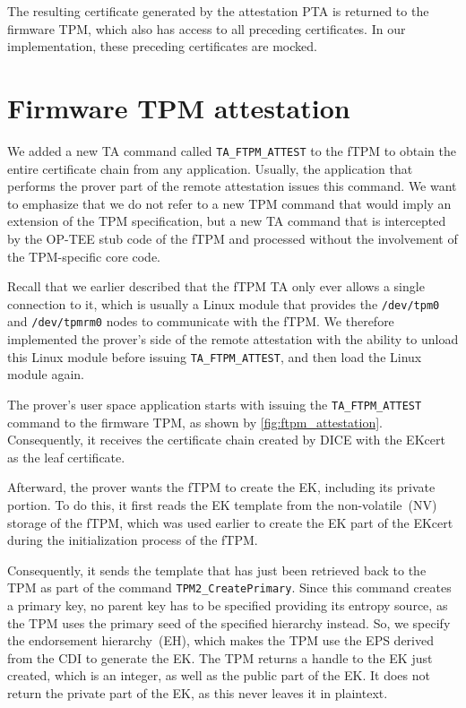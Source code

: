 The resulting certificate generated by the attestation PTA is returned to the firmware TPM, which also has access to all preceding certificates.
In our implementation, these preceding certificates are mocked.

\section{Firmware TPM attestation}\label{sec:impl_ftpm_attestation}



We added a new TA command called \texttt{TA\_FTPM\_ATTEST} to the \ac{fTPM} to obtain the entire certificate chain from any application.
Usually, the application that performs the prover part of the remote attestation issues this command.
We want to emphasize that we do not refer to a new TPM command that would imply an extension of the TPM specification, but a new TA command that is intercepted by the OP-TEE stub code of the \ac{fTPM} and processed without the involvement of the TPM-specific core code.

Recall that we earlier described that the \ac{fTPM} TA only ever allows a single connection to it, which is usually a Linux module that provides the \texttt{/dev/tpm0} and \texttt{/dev/tpmrm0} nodes to communicate with the \ac{fTPM}\@.
We therefore implemented the prover's side of the remote attestation with the ability to unload this Linux module before issuing \texttt{TA\_FTPM\_ATTEST}, and then load the Linux module again.

The prover's user space application starts with issuing the \texttt{TA\_FTPM\_ATTEST} command to the firmware TPM, as shown by \autoref{fig:ftpm_attestation}.
Consequently, it receives the certificate chain created by DICE with the EKcert as the leaf certificate.

Afterward, the prover wants the \ac{fTPM} to create the EK, including its private portion.
To do this, it first reads the EK template from the non-volatile~(NV) storage of the fTPM, which was used earlier to create the EK part of the EKcert during the initialization process of the \ac{fTPM}.

Consequently, it sends the template that has just been retrieved back to the TPM as part of the command \texttt{TPM2\_CreatePrimary}.
Since this command creates a primary key, no parent key has to be specified providing its entropy source, as the TPM uses the primary seed of the specified hierarchy instead.
So, we specify the endorsement hierarchy~(EH), which makes the TPM use the \ac{EPS} derived from the \ac{CDI} to generate the \ac{EK}\@.
The TPM returns a handle to the \ac{EK} just created, which is an integer, as well as the public part of the \ac{EK}\@.
It does not return the private part of the \ac{EK}, as this never leaves it in plaintext.

